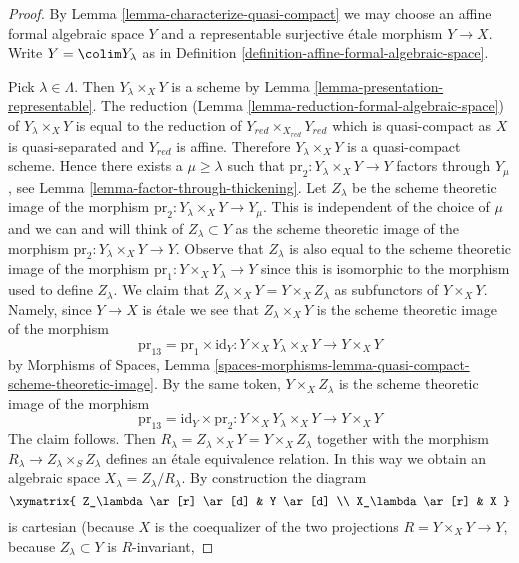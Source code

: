 \begin{proof}
By Lemma \ref{lemma-characterize-quasi-compact} we may choose an
affine formal algebraic space $Y$ and a representable surjective
\'etale morphism $Y \to X$. Write $Y = \colim Y_\lambda$ as in
Definition \ref{definition-affine-formal-algebraic-space}.

\medskip\noindent
Pick $\lambda \in \Lambda$. Then $Y_\lambda \times_X Y$ is a scheme by
Lemma \ref{lemma-presentation-representable}. The reduction
(Lemma \ref{lemma-reduction-formal-algebraic-space})
of $Y_\lambda \times_X Y$ is equal to the reduction of
$Y_{red} \times_{X_{red}} Y_{red}$ which is quasi-compact as $X$
is quasi-separated and $Y_{red}$ is affine.
Therefore $Y_\lambda \times_X Y$ is a quasi-compact scheme.
Hence there exists a $\mu \geq \lambda$ such that
$\text{pr}_2 : Y_\lambda \times_X Y \to Y$ factors
through $Y_\mu$, see Lemma \ref{lemma-factor-through-thickening}.
Let $Z_\lambda$ be the scheme theoretic image of the morphism
$\text{pr}_2 : Y_\lambda \times_X Y \to Y_\mu$.
This is independent of the choice of $\mu$ and we can and
will think of $Z_\lambda \subset Y$ as the scheme theoretic
image of the morphism $\text{pr}_2 : Y_\lambda \times_X Y \to Y$.
Observe that $Z_\lambda$ is also equal to the scheme theoretic image
of the morphism $\text{pr}_1 : Y \times_X Y_\lambda \to Y$ since
this is isomorphic to the morphism used to define $Z_\lambda$.
We claim that $Z_\lambda \times_X Y = Y \times_X Z_\lambda$ as subfunctors
of $Y \times_X Y$. Namely, since $Y \to X$ is \'etale we see that
$Z_\lambda \times_X Y$ is the scheme theoretic image of the morphism
$$
\text{pr}_{13} = \text{pr}_1 \times \text{id}_Y :
Y \times_X Y_\lambda \times_X Y \longrightarrow Y \times_X Y
$$
by Morphisms of Spaces, Lemma
\ref{spaces-morphisms-lemma-quasi-compact-scheme-theoretic-image}.
By the same token, $Y \times_X Z_\lambda$ is the scheme theoretic image
of the morphism
$$
\text{pr}_{13} = \text{id}_Y \times \text{pr}_2 : 
Y \times_X Y_\lambda \times_X Y \longrightarrow Y \times_X Y
$$
The claim follows. Then
$R_\lambda = Z_\lambda \times_X Y = Y \times_X Z_\lambda$
together with the morphism $R_\lambda \to Z_\lambda \times_S Z_\lambda$
defines an \'etale equivalence relation. In this way we obtain an algebraic
space $X_\lambda = Z_\lambda/R_\lambda$. By construction the diagram
$$
\xymatrix{
Z_\lambda \ar[r] \ar[d] & Y \ar[d] \\
X_\lambda \ar[r] & X
}
$$
is cartesian (because $X$ is the coequalizer of the two projections
$R = Y \times_X Y \to Y$, because $Z_\lambda \subset Y$ is $R$-invariant,

\end{proof}
